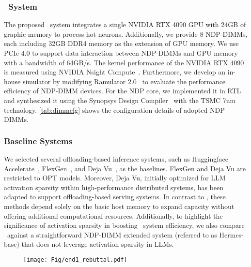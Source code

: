 \subsubsection{\name~System}
The proposed \name~system integrates a single NVIDIA RTX 4090 GPU with 24GB of graphic memory  to process hot neurons. Additionally, we provide 8 NDP-DIMMs, each including 32GB DDR4 memory as the extension of GPU memory. We use PCIe 4.0 to support data interaction between NDP-DIMMs and GPU memory with a bandwidth of 64GB/s. The kernel performance of the NVIDIA RTX 4090 is measured using NVIDIA Nsight Compute~\cite{nsight}. Furthermore, we develop an in-house simulator by modifying Ramulator 2.0~\cite{luo2023ramulator, ramulator2.0} to evaluate the performance efficiency of NDP-DIMM devices. For the NDP core, we implemented it in RTL and synthesized it using the Synopsys Design Compiler~\cite{synopsys.org} with the TSMC 7nm technology. \tab \ref{tab:dimmcfg} shows the configuration details of adopted NDP-DIMMs.

\subsubsection{Baseline Systems}
We selected several offloading-based inference systems, such as Huggingface Accelerate~\cite{jain2022hugging, huggingface-accelerate}, FlexGen~\cite{sheng2023flexgen}, and Deja Vu~\cite{liu2023deja}, as the baselines. FlexGen and Deja Vu are restricted to OPT models. Moreover, Deja Vu, initially optimized for LLM activation sparsity within high-performance distributed systems, has been adapted to support offloading-based serving systems. In contrast to \name, these methods depend solely on the basic host memory to expand capacity without offering additional computational resources.  Additionally, to highlight the significance of activation sparsity in boosting \name~system efficiency, we also compare \name~against a straightforward NDP-DIMM extended system (referred to as Hermes-base) that does not leverage activation sparsity in LLMs.

\begin{figure}
    \centering
    \texttt{[image: Fig/end1\_rebuttal.pdf]}
    \vspace{-0.3cm}
    \caption{}
    \label{fig:offloading-performance}
\vspace{-0.3cm}
\end{figure}

